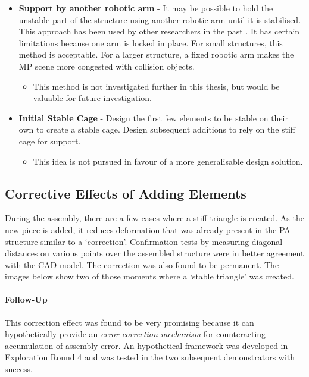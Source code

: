 \begin{itemize}
    \item \textbf{Support by another robotic arm} - It may be possible to hold the unstable part of the structure using another robotic arm until it is stabilised. This approach has been used by other researchers in the past \parencite{adelDesignRoboticallyFabricated2018,helmreichRoboticAssemblyModular2022,paraschoComputationalDesignRobotically2018}. It has certain limitations because one arm is locked in place. For small structures, this method is acceptable. For a larger structure, a fixed robotic arm makes the MP scene more congested with collision objects.
    \begin{itemize}
        \item This method is not investigated further in this thesis, but would be valuable for future investigation.
    \end{itemize}

    \item \textbf{Initial Stable Cage} - Design the first few elements to be stable on their own to create a stable cage. Design subsequent additions to rely on the stiff cage for support.
    \begin{itemize}
        \item This idea is not pursued in favour of a more generalisable design solution.
    \end{itemize}
\end{itemize}

\subsection{Corrective Effects of Adding Elements}
\label{subsection:exploration-2-corrective-effects-of-adding-elements}

During the assembly, there are a few cases where a stiff triangle is created. As the new piece is added, it reduces deformation that was already present in the PA structure similar to a ‘correction’. Confirmation tests by measuring diagonal distances on various points over the assembled structure were in better agreement with the CAD model. The correction was also found to be permanent. The images below show two of those moments where a ‘stable triangle’ was created.

\paragraph{Follow-Up}

This correction effect was found to be very promising because it can hypothetically provide an \textit{error-correction mechanism} for counteracting accumulation of assembly error. An hypothetical framework was developed in Exploration Round 4  and was tested in the two subsequent demonstrators with success.

